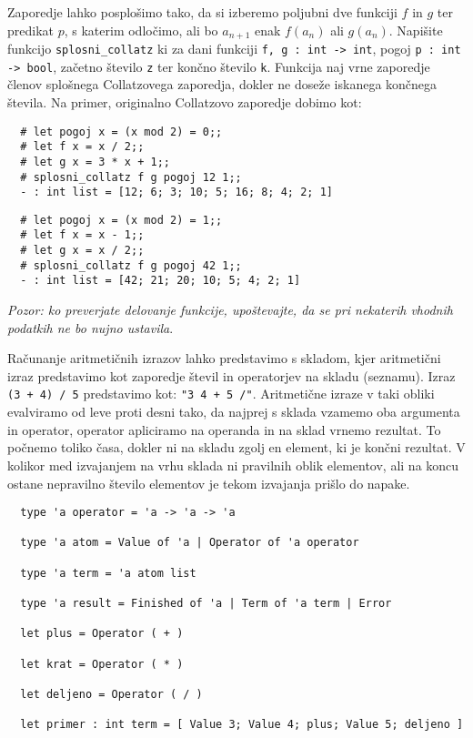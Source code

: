 \documentclass[arhiv]{../izpit}
\begin{document}
Zaporedje lahko posplošimo tako, da si izberemo poljubni dve funkciji $f$ in $g$ ter predikat $p$, s katerim odločimo, ali bo $a_{n + 1}$ enak $f(a_n)$ ali $g(a_n)$. Napišite funkcijo \verb|splosni_collatz| ki za dani funkciji \verb|f, g : int -> int|, pogoj \verb|p : int -> bool|, začetno število \verb|z| ter končno število \verb|k|. Funkcija naj vrne zaporedje členov splošnega Collatzovega zaporedja, dokler ne doseže iskanega končnega števila. Na primer, originalno Collatzovo zaporedje dobimo kot:

\begin{verbatim}
  # let pogoj x = (x mod 2) = 0;;
  # let f x = x / 2;;
  # let g x = 3 * x + 1;;
  # splosni_collatz f g pogoj 12 1;;
  - : int list = [12; 6; 3; 10; 5; 16; 8; 4; 2; 1]
\end{verbatim}

\begin{verbatim}
  # let pogoj x = (x mod 2) = 1;;
  # let f x = x - 1;;
  # let g x = x / 2;;
  # splosni_collatz f g pogoj 42 1;;
  - : int list = [42; 21; 20; 10; 5; 4; 2; 1]
\end{verbatim}

\emph{Pozor: ko preverjate delovanje funkcije, upoštevajte, da se pri nekaterih vhodnih podatkih ne bo nujno ustavila}.



\naloga

Računanje aritmetičnih izrazov lahko predstavimo s skladom, kjer aritmetični izraz predstavimo kot 
zaporedje števil in operatorjev na skladu (seznamu). 
Izraz \verb|(3 + 4) / 5| predstavimo kot: \verb|"3 4 + 5 /"|. 
Aritmetične izraze v taki obliki evalviramo od leve proti desni tako, da najprej s sklada vzamemo 
oba argumenta in operator, operator apliciramo na operanda in na sklad vrnemo rezultat. 
To počnemo toliko časa, dokler ni na skladu zgolj en element, ki je končni rezultat. 
V kolikor med izvajanjem na vrhu sklada ni pravilnih oblik elementov, ali na koncu ostane nepravilno 
število elementov je tekom izvajanja prišlo do napake.  

\begin{verbatim}
  type 'a operator = 'a -> 'a -> 'a

  type 'a atom = Value of 'a | Operator of 'a operator
  
  type 'a term = 'a atom list
  
  type 'a result = Finished of 'a | Term of 'a term | Error
  
  let plus = Operator ( + )
  
  let krat = Operator ( * )
  
  let deljeno = Operator ( / )
  
  let primer : int term = [ Value 3; Value 4; plus; Value 5; deljeno ]    
\end{verbatim}
\end{document}
